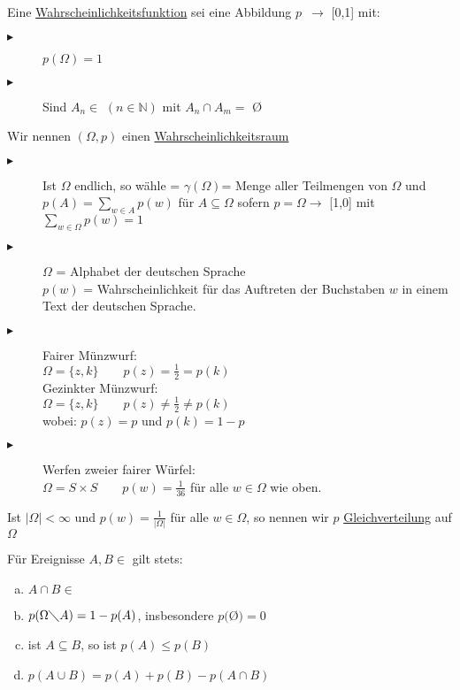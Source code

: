 Eine \underline{Wahrscheinlichkeitsfunktion} sei eine Abbildung $p$\, \normalfont{} $\rightarrow$ [0,1] mit:
\begin{description}
	\item[$\blacktriangleright$] $p(\Omega)=1$
	\item[$\blacktriangleright$] Sind $A_{n} \in$ \normalfont{}
		$(n\in\mathbb{N})$ mit $A_{n} \cap A_{m} =$ \O
\end{description}

Wir nennen $(\Omega,p)$ einen \underline{Wahrscheinlichkeitsraum}

%
%
%

\bsp 
\begin{description}
	\item[$\blacktriangleright$] Ist $\Omega$ endlich, so wähle \normalfont{} = 
		$\gamma ( \Omega)$= Menge aller Teilmengen von $\Omega$ und 
		$p(A)=\sum\limits_{w\in A} p(w)$ für $A \subseteq \Omega$ sofern $p=\Omega 
		\rightarrow$ [1,0] mit $\sum\limits_{w\in\Omega}p(w) = 1$
	\item[$\blacktriangleright$] $\Omega$ = Alphabet der deutschen Sprache \\
		$p(w)$ = Wahrscheinlichkeit für das Auftreten der Buchstaben $w$ in einem 
		Text der deutschen Sprache.
	\item[$\blacktriangleright$] \quad Fairer Münzwurf:\\
		$\Omega = \{z,k\} \qquad p(z) = \frac{1}{2} = p(k)$\\
		Gezinkter Münzwurf:\\
		$\Omega = \{z,k\} \qquad p(z) \neq \frac{1}{2} \neq p(k)$\\
		wobei: $p(z) = p$ und $p(k) = 1-p$
	\item[$\blacktriangleright$] \quad Werfen zweier fairer Würfel:\\
		$\Omega = S\times S \qquad p(w) = \frac{1}{36}$ für alle $w \in \Omega$ wie 
		oben.
\end{description}	

%
%
%
Ist $|\Omega| < \infty$ und $p(w) = \frac{1}{|\Omega|}$ für alle $w \in \Omega$, so nennen wir $p$ \underline{Gleichverteilung} auf $\Omega$

%
%
%

\stz
Für Ereignisse $A,B \in $ \normalfont{} gilt stets:
\begin{enumerate}[a) ]
	\item $A\cap B \in$ \normalfont{}
	\item $p(\Omega \diagdown A)=1-p(A)$, insbesondere $p($\O$) = 0$
	\item ist $A \subseteq B$, so ist $p(A) \leq p(B)$
	\item $p(A\cup B) = p(A) + p(B) - p(A\cap B)$
\end{enumerate}
\qquad \\
\qquad\\
%
%
%

